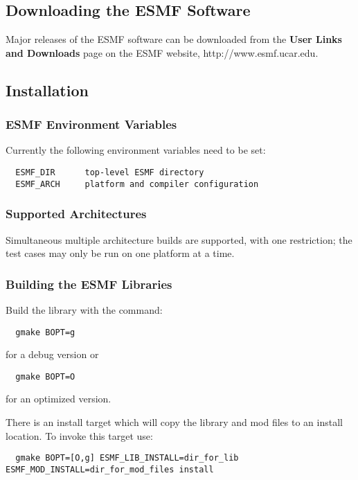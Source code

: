 
\subsection{Downloading the ESMF Software}

Major releases of the ESMF software can be downloaded from the {\bf User Links and
Downloads} page on the ESMF website, 
{http://www.esmf.ucar.edu}.  

\subsection{Installation}
\label{InstallProcedures}

\subsubsection{ESMF Environment Variables}

Currently the following environment variables need to be set:
\begin{verbatim}
  ESMF_DIR      top-level ESMF directory
  ESMF_ARCH     platform and compiler configuration
\end{verbatim}


\subsubsection{Supported Architectures}




Simultaneous multiple architecture builds are supported, with
one restriction; the test cases may only be run on one platform at a time. 

\subsubsection{Building the ESMF Libraries}
\label{BuildESMF}

Build the library with the command:
\begin{verbatim}
  gmake BOPT=g  
\end{verbatim}
  for a debug version or
\begin{verbatim}
  gmake BOPT=O  
\end{verbatim}
  for an optimized version.

There is an install target which will copy the library and mod files to an
install location.  To invoke this target use:
\begin{verbatim}
  gmake BOPT=[O,g] ESMF_LIB_INSTALL=dir_for_lib ESMF_MOD_INSTALL=dir_for_mod_files install 
\end{verbatim}

